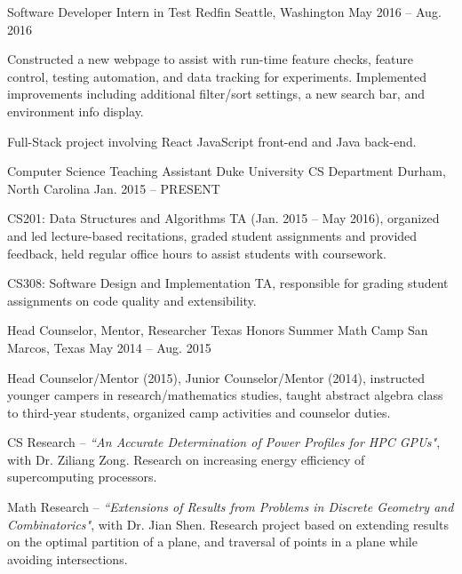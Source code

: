 \begin{cventries}
  \cventry
    {Software Developer Intern in Test}
    {Redfin}
    {Seattle, Washington}
    {May 2016 -- Aug. 2016}
    {
      \begin{cvitems}
        \item {Constructed a new webpage to assist with run-time feature checks, feature control, testing automation, and data tracking for experiments. Implemented improvements including additional filter/sort settings, a new search bar, and environment info display.}
        \item {Full-Stack project involving React JavaScript front-end and Java back-end.}
      \end{cvitems}
    }
  \cventry
    {Computer Science Teaching Assistant}
    {Duke University CS Department}
    {Durham, North Carolina}
    {Jan. 2015 -- PRESENT}
    {
      \begin{cvitems}
        \item {CS201: Data Structures and Algorithms TA (Jan. 2015 -- May 2016), organized and led lecture-based recitations, graded student assignments and provided feedback, held regular office hours to assist students with coursework.}
        \item {CS308: Software Design and Implementation TA, responsible for grading student assignments on code quality and extensibility.}
      \end{cvitems}
    }
  \cventry
    {Head Counselor, Mentor, Researcher}
    {Texas Honors Summer Math Camp}
    {San Marcos, Texas}
    {May 2014 -- Aug. 2015}
    {
      \begin{cvitems}
        \item {Head Counselor/Mentor (2015), Junior Counselor/Mentor (2014), instructed younger campers in research/mathematics studies, taught abstract algebra class to third-year students, organized camp activities and counselor duties.}
        \item {CS Research -- \emph{``An Accurate Determination of Power Profiles for HPC GPUs"}, with Dr. Ziliang Zong. Research on increasing energy efficiency of supercomputing processors.}
        \item {Math Research -- \emph{``Extensions of Results from Problems in Discrete Geometry and Combinatorics"}, with Dr. Jian Shen. Research project based on extending results on the optimal partition of a plane, and traversal of points in a plane while avoiding intersections.}
      \end{cvitems} 
    }
\end{cventries}
